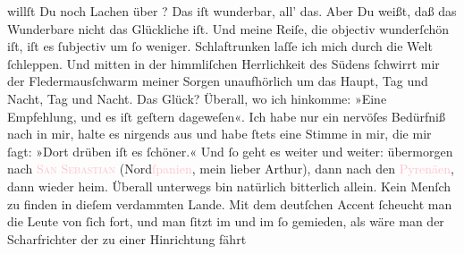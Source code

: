                willſt Du noch Lachen über \label{K_L02701-5v}\label{K_L02701-5h}?\pend
           \pstart
           Das iſt wunderbar, all’ das. Aber Du {\pb}weißt, daß das
               Wunderbare nicht das Glückliche iſt. Und meine Reiſe, die objectiv wunderſchön iſt,
               iſt es ſubjectiv um ſo weniger. Schlaftrunken laſſe ich mich durch die Welt
               ſchleppen. Und mitten in der himmliſchen Herrlichkeit des Südens ſchwirrt mir der
               Fledermausſchwarm meiner Sorgen unaufhörlich um das Haupt, Tag und Nacht, Tag und
               Nacht. Das Glück? Überall, wo ich hinkomme: »Eine Empfehlung, {\pb}und es iſt geſtern dageweſen«. Ich habe nur ein
               nervöſes Bedürfniß nach \label{K_L02701-2v}\label{K_L02701-2h} in mir, halte es
               nirgends aus und habe ſtets eine Stimme in mir, die mir ſagt: »Dort drüben iſt es
               ſchöner.« Und ſo geht es weiter und weiter: übermorgen
               nach \textsc{\textcolor{pink}{San Sebastian}{}\ledrightnote{\textcolor{pink}{San Sebastian}}} (Nord\textcolor{pink}{ſpanien}{}\ledrightnote{\textcolor{pink}{Spanien}}, mein lieber Arthur), dann
               nach den \textcolor{pink}{Pyrenäen}{}\ledrightnote{\textcolor{pink}{Pyrenees}}, dann wieder heim. Überall
               unterwegs bin natürlich {\pb}bitterlich allein. Kein
               Menſch zu finden in dieſem verdammten Lande. Mit dem deutſchen Accent ſcheucht man
               die Leute von ſich fort,  und man ſitzt im \label{K_L02701-3v}\label{K_L02701-3h} und im
                  \label{T_L02701-3v}\label{T_L02701-3h} ſo gemieden, als wäre man der Scharfrichter der zu
               einer Hinrichtung fährt{\dotsfour}\pend
